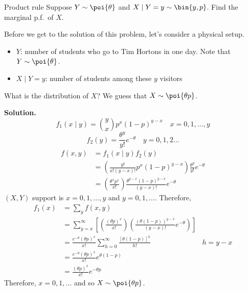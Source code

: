 \begin{Example}{Product rule}{}
    Suppose $ Y \sim \poi{\theta} $ and $ X\mid Y=y \sim \bin{y,p} $.
    Find the marginal p.f.\ of $ X $.

    Before we get to the solution of this problem, let's consider a physical setup.
    \begin{itemize}
        \item $ Y $: number of students who go to Tim Hortons
              in one day. Note that $ Y \sim \poi{\theta} $.
        \item $ X\mid Y=y $: number of students among
              these $ y $ visitors
    \end{itemize}
    What is the distribution of $ X $? We guess that $ X \sim \poi{\theta p} $.

    \textbf{Solution.}
    \[ f_1(x\mid y)=\binom{y}{x}p^x (1-p)^{y-x}\quad x=0,1,\ldots,y \]
    \[ f_2(y)=\frac{\theta^y}{y!}e^{-\theta}\quad y=0,1,2\ldots  \]
    \begin{align*}
        f(x,y)
         & =f_1(x\mid y)f_2(y)                                                                        \\
         & =\left( \frac{y!}{x!(y-x)!}p^x(1-p)^{y-x} \right)\frac{\theta^y}{y!} e^{-\theta}           \\
         & =\left( \frac{\theta^x p^x}{x!}  \right)\frac{\theta^{y-x}(1-p)^{y-x}}{(y-x)!} e^{-\theta}
    \end{align*}
    $ (X,Y) $ support is $ x=0,1,\ldots,y $ and $ y=0,1,\ldots $. Therefore,
    \begin{align*}
        f_1(x)
         & =\sum_{y}f(x,y)                                                                                                 \\
         & =\sum_{y=x}^{\infty}
        \left[ \left( \frac{(\theta p)^x}{x!} \right)\left( \frac{(\theta(1-p))^{y-x}}{(y-x)!} e^{-\theta} \right) \right] \\
         & =\frac{e^{-\theta} (\theta p)^x}{x!} \sum_{h=0}^{\infty} \frac{\left[ \theta(1-p) \right]^h}{h!} & h=y-x        \\
         & =\frac{e^{-\theta} (\theta p)^x}{x!}e^{\theta(1-p)}                                                             \\
         & =\frac{(\theta p)^x}{x!}e^{-\theta p}
    \end{align*}
    Therefore, $ x=0,1,\ldots $ and so $ X \sim \poi{\theta p} $.
\end{Example}
